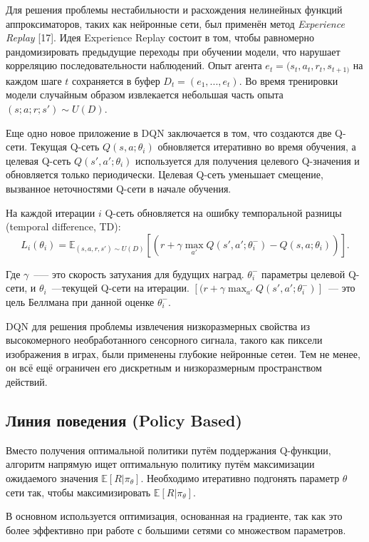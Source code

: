 Для решения проблемы нестабильности и расхождения нелинейных функций аппроксиматоров, таких как нейронные сети, был применён метод {\itshape Experience Replay} [17]. Идея Experience Replay состоит в том, чтобы равномерно рандомизировать предыдущие переходы при обучении модели, что нарушает корреляцию последовательности наблюдений. Опыт агента ${e_t = (s_t, a_t, r_t, s_{t+1)}}$ на каждом шаге $t$ сохраняется в буфер ${D_t = ({e_1, ..., e_t})}$. Во время тренировки модели случайным образом извлекается небольшая часть опыта ${(s; a; r; s') \sim U(D)}$.

Еще одно новое приложение в DQN заключается в том, что создаются две Q-сети.
Текущая Q-сеть $Q(s, a; \theta_i)$ обновляется итеративно во время обучения, а целевая Q-сеть $Q(s', a'; \theta_i)$ используется для получения целевого Q-значения и обновляется только периодически. Целевая Q-сеть уменьшает смещение, вызванное неточностями Q-сети в начале обучения.

На каждой итерации $i$ Q-сеть обновляется на ошибку темпоральной разницы (temporal difference, TD):
\begin{equation}
    \label{eq:someEq}
    L_i(\theta_i) = \mathbb{E}_{(s, a, r, s') \sim U(D)} [(r + \gamma \max_{a'} Q(s', a'; \theta_i^-) - Q(s, a; \theta _i))].
\end{equation}

Где $\gamma$~--— это скорость затухания для будущих наград. $\theta _i^-$ параметры целевой Q-сети, и $\theta_i$~---текущей Q-сети на итерации. $[(r + \gamma \max_{a'} Q(s', a'; \theta_i^-)]$~--- это цель Беллмана при данной оценке $\theta_i^-$.

DQN для решения проблемы извлечения низкоразмерных свойства из высокомерного необработанного сенсорного сигнала, такого как пиксели изображения в играх, были применены глубокие нейронные сетеи. Тем не менее, он всё ещё ограничен его дискретным и низкоразмерным пространством действий.

\subsection{Линия поведения (Policy Based)}

Вместо получения оптимальной политики путём поддержания Q-функции, алгоритм напрямую ищет оптимальную политику путём максимизации ожидаемого значения $\mathbb{E}[R|\pi_\theta]$. Необходимо итеративно подгонять параметр $\theta$ сети так, чтобы максимизировать $\mathbb{E}[R|\pi_\theta]$.

В основном используется оптимизация, основанная на градиенте, так как это более эффективно при работе с большими сетями со множеством параметров. \cite{Arulkumaran_2017}

